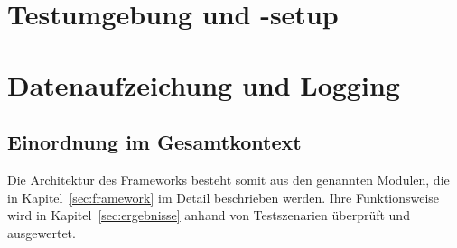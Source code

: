 







\section{Testumgebung und -setup}


\section{Datenaufzeichung und Logging}



\subsection*{Einordnung im Gesamtkontext}
Die Architektur des Frameworks besteht somit aus den genannten Modulen, die in
Kapitel~\ref{sec:framework} im Detail beschrieben werden. Ihre Funktionsweise wird in
Kapitel~\ref{sec:ergebnisse} anhand von Testszenarien überprüft und ausgewertet.
